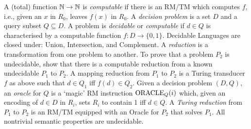  A (total) function $\mathbb{N} \to \mathbb{N}$ is \emph{computable} if there is an RM/TM which computes $f$, i.e., given an $x$ in $R_0$, leaves $f(x)$ in $R_0$.
 A \emph{decision problem} is a set $D$ and a query subset $Q \subseteq D$. A problem is \emph{decidable} or \emph{computable} if $d \in Q$ is characterised by a computable function $f: D\to \{0,1\}$.
 Decidable Languages are closed under: Union, Intersection, and Complement.
 A \emph{reduction} is a transformation from one problem to another. To prove that a problem $P_2$ is undecidable, show that there is a computable reduction from a known undecidable $P_1$ to $P_2$.
 A mapping reduction from $P_1$ to $P_2$ is a Turing transducer $f$ as above such that $d \in Q_1$ iff $f(d) \in Q_2$.
 Given a decision problem $(D,Q)$, an \emph{oracle} for $Q$ is a `magic' RM instruction $\operatorname{ORACLE}_Q(i)$ which, given an encoding of $d \in D$ in $R_i$, sets $R_i$ to contain 1 iff $d \in Q$.
 A \emph{Turing reduction} from $P_1$ to $P_2$ is an RM/TM equipped with an Oracle for $P_2$ that solves $P_1$.
 All nontrivial semantic properties are undecidable.